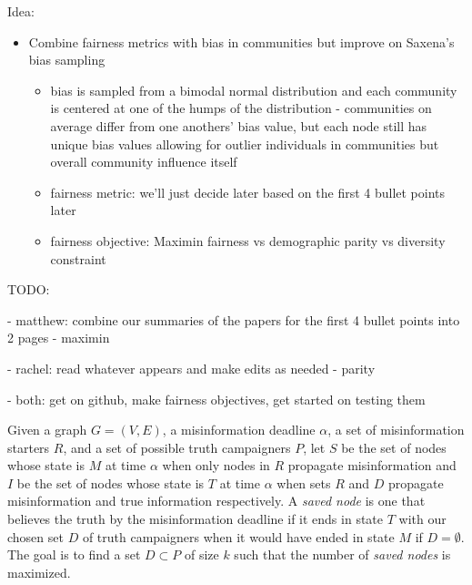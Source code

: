 \documentclass[11pt]{article}
\begin{document}
Idea:
\begin{itemize}
    \item Combine fairness metrics with bias in communities but improve on Saxena's bias sampling
    \begin{itemize}
        \item bias is sampled from a bimodal normal distribution and each community is centered at one of the humps of the distribution - communities on average differ from one anothers' bias value, but each node still has unique bias values allowing for outlier individuals in communities but overall community influence itself
        \item fairness metric: we'll just decide later based on the first 4 bullet points later
        \item fairness objective: Maximin fairness vs demographic parity vs diversity constraint
    \end{itemize}
\end{itemize}











TODO:

- matthew: combine our summaries of the papers for the first 4 bullet points into 2 pages - maximin

- rachel: read whatever appears and make edits as needed - parity

- both: get on github, make fairness objectives, get started on testing them

Given a graph $G=(V,E)$, a misinformation deadline $\alpha$, a set of misinformation starters $R$, and a set of possible truth campaigners $P$, let $S$ be the set of nodes whose state is $M$ at time $\alpha$ when only nodes in $R$ propagate misinformation and $I$ be the set of nodes whose state is $T$ at time $\alpha$ when sets $R$ and $D$ propagate misinformation and true information respectively. A \textit{saved node} is one that believes the truth by the misinformation deadline if it ends in state $T$ with our chosen set $D$ of truth campaigners when it would have ended in state $M$ if $D=\emptyset$. The goal is to find a set $D\subset P$ of size $k$ such that the number of \textit{saved nodes} is maximized.
\end{document}

